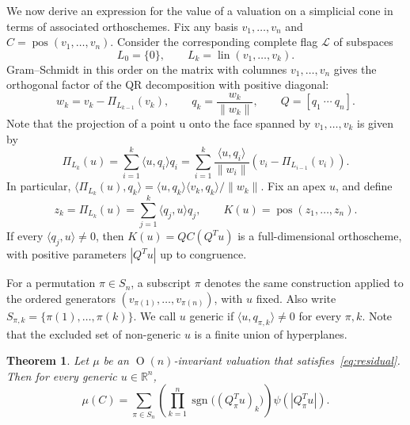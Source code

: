 \documentclass[11pt]{article}
\DeclareMathOperator{\pos}{pos}
\newcommand{\R}{\mathbb{R}}
\newcommand{\ip}[2]{\langle #1,#2\rangle}
\newcommand{\norm}[1]{\lVert #1\rVert}
\newcommand{\On}[1]{\operatorname{O}(#1)}
\newcommand{\lin}{\operatorname{lin}}
\DeclareMathOperator{\sgn}{sgn}
\newtheorem{theorem}{Theorem}[section]
\begin{document}
We now derive an expression for the value of a valuation on a simplicial cone in terms
of associated orthoschemes. 
Fix any basis $v_1,\ldots,v_n$ and $C=\pos(v_1,\ldots,v_n)$.
Consider the corresponding complete flag $\mathcal{L}$ of subspaces
\[
 L_0=\{0\},\qquad L_k=\lin(v_1,\ldots,v_k).
\]
Gram--Schmidt in this order on the matrix with columnes $v_1,\dots,v_n$ gives the orthogonal factor of the QR
decomposition with positive diagonal:
\begin{equation}\label{eq:frame}
 w_k=v_k-\Pi_{L_{k-1}}(v_k),\qquad
 q_k=\frac{w_k}{\norm{w_k}},\qquad
 Q=[q_1\ \cdots\ q_n].
\end{equation}
Note that the projection of a point u onto the face spanned by ${v_1,\dots,v_k}$ is given by 
\begin{equation*}
\Pi_{L_k}(u) = \sum_{i=1}^k \langle u,q_i\rangle q_i = \sum_{i=1}^k \frac{\langle u,q_i \rangle}{\|w_i\|} (v_i-\Pi_{L_{i-1}}(v_i)).
\end{equation*}
In particular, $\langle \Pi_{L_k}(u), q_k \rangle = \langle u,q_k\rangle \langle v_k,q_k\rangle/\|w_k\|$.
Fix an apex $u$, and define
\begin{equation}\label{eq:projected-flag}
 z_k=\Pi_{L_k}(u)=\sum_{j=1}^k \langle q_j,u\rangle q_j, \qquad K(u)=\pos(z_1,\ldots,z_n).
\end{equation}
If every $\langle q_j,u\rangle \ne0$, then $K(u)=QC(Q^Tu)$ is a full-dimensional orthoscheme,
with positive parameters $|Q^Tu|$ up to congruence.

For a permutation $\pi\in S_n$, a subscript $\pi$ denotes the same construction applied
to the ordered generators $(v_{\pi(1)},\ldots,v_{\pi(n)})$, with $u$ fixed.
Also write $S_{\pi,k}=\{\pi(1),\ldots,\pi(k)\}$.
We call $u$ generic if $\ip{u}{q_{\pi,k}}\ne0$ for every
$\pi,k$. Note that the excluded set of non-generic $u$ is a finite union of hyperplanes.

\begin{theorem}\label{thm:flag}
Let $\mu$ be an $\On n$-invariant valuation that satisfies~\eqref{eq:residual}. Then for every generic $u\in\R^n$,
\begin{equation}\label{eq:flag}
 \mu(C)=\sum_{\pi\in S_n}
  \left(\prod_{k=1}^n\sgn\bigl((Q_\pi^Tu)_k\bigr)\right)
  \psi(|Q_\pi^Tu|).
\end{equation}
\end{theorem}
\end{document}
